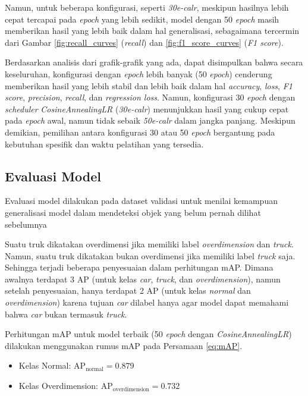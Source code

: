 Namun, untuk beberapa konfigurasi, seperti \emph{30e-calr}, meskipun hasilnya lebih cepat tercapai pada \emph{epoch} yang lebih sedikit, model dengan 50 \emph{epoch} masih memberikan hasil yang lebih baik dalam hal generalisasi, sebagaimana tercermin dari Gambar \ref{fig:recall_curves} (\emph{recall}) dan \ref{fig:f1_score_curves} (\emph{F1 score}).

Berdasarkan analisis dari grafik-grafik yang ada, dapat disimpulkan bahwa secara keseluruhan, konfigurasi dengan \emph{epoch} lebih banyak (50 \emph{epoch}) cenderung memberikan hasil yang lebih stabil dan lebih baik dalam hal \emph{accuracy}, \emph{loss}, \emph{F1 score}, \emph{precision}, \emph{recall}, dan \emph{regression loss}. Namun, konfigurasi 30 \emph{epoch} dengan \emph{scheduler} \emph{CosineAnnealingLR} (\emph{30e-calr}) menunjukkan hasil yang cukup cepat pada \emph{epoch} awal, namun tidak sebaik \emph{50e-calr} dalam jangka panjang. Meskipun demikian, pemilihan antara konfigurasi 30 atau 50 \emph{epoch} bergantung pada kebutuhan spesifik dan waktu pelatihan yang tersedia.

\subsection{Evaluasi Model}

Evaluasi model dilakukan pada dataset validasi untuk menilai kemampuan generalisasi model dalam mendeteksi objek yang belum pernah dilihat sebelumnya

Suatu truk dikatakan overdimensi jika memiliki label \emph{overdimension} dan \emph{truck}. Namun, suatu truk dikatakan bukan overdimensi jika memiliki label \emph{truck} saja. Sehingga terjadi beberapa penyesuaian dalam perhitungan mAP. Dimana awalnya terdapat 3 AP (untuk kelas \emph{car}, \emph{truck}, dan \emph{overdimension}), namun setelah penyesuaian, hanya terdapat 2 AP (untuk kelas \emph{normal} dan \emph{overdimension}) karena tujuan \emph{car} dilabel hanya agar model dapat memahami bahwa \emph{car} bukan termasuk \emph{truck}.

Perhitungan mAP untuk model terbaik (50 \emph{epoch} dengan \emph{CosineAnnealingLR}) dilakukan menggunakan rumus mAP pada Persamaan \ref{eq:mAP}.

\begin{itemize}[nolistsep]
  \item Kelas Normal: $\mbox{AP}_{\mbox{normal}} = 0.879$
  \item Kelas Overdimension: $\mbox{AP}_{\mbox{overdimension}} = 0.732$
\end{itemize}

